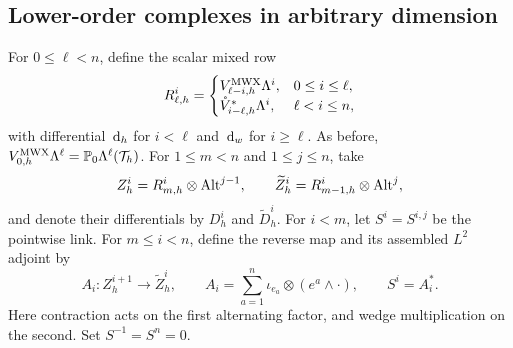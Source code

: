 \documentclass[10pt]{amsart}
\numberwithin{equation}{section}
\newcommand{\dd}{\,{\rm d}}
\begin{document}
\subsection{Lower-order complexes in arbitrary dimension}

For $0\leq\ell<n$, define the scalar mixed row
\[
R_{\ell,h}^i=
\begin{cases}
V_{\ell-i,h}^{\rm MWX}\Lambda^i,&0\leq i\leq\ell,\\
\mathring V_{i-\ell,h}^{*}\Lambda^i,&\ell<i\leq n,
\end{cases}
\]
with differential $\dd_h$ for $i<\ell$ and $\dd_w$ for $i\geq\ell$.
As before, $V_{0,h}^{\rm MWX}\Lambda^\ell=\mathbb P_0\Lambda^\ell(\mathcal T_h)$.
For $1\leq m<n$ and $1\leq j\leq n$, take
\[
Z_h^i=R_{m,h}^i\otimes{\rm Alt}^{j-1},\qquad
\widetilde Z_h^i=R_{m-1,h}^i\otimes{\rm Alt}^j,
\]
and denote their differentials by $D_h^i$ and $\widetilde D_h^i$.
For $i<m$, let $S^i=S^{i,j}$ be the pointwise link.
For $m\leq i<n$, define the reverse map and its assembled $L^2$ adjoint by
\begin{equation}\label{eq:lowerBGGweakLinks}
A_i:Z_h^{i+1}\longrightarrow\widetilde Z_h^i,
\qquad A_i=\sum_{a=1}^n\iota_{e_a}\otimes(e^a\wedge\cdot),
\qquad S^i=A_i^*.
\end{equation}
Here contraction acts on the first alternating factor, and wedge multiplication
on the second. Set $S^{-1}=S^n=0$.
\end{document}
